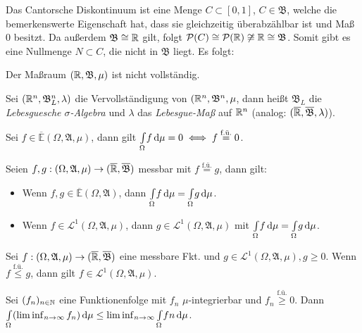 \documentclass{cheat-sheet}
\newcommand{\ER}{\overline\R} %
\newcommand{\PS}{\mathcal{P}} %
\newcommand{\Alg}{\mathfrak{A}} %
\newcommand{\Bor}{\mathfrak{B}} %
\newcommand{\E}{\mathbb{E}} %
\newcommand{\Leb}{\mathcal{L}} %
\newcommand{\fue}{\overset{\text{f.ü.}}} %
\newcommand{\IntOmu}[1]{\Int{\Omega}{}{#1}{\mu}} %
\begin{document}
\begin{bem}
  Das Cantorsche Diskontinuum ist eine Menge $C \subset [0, 1]$, $C \in \Bor$, welche die bemerkenswerte Eigenschaft hat, dass sie gleichzeitig überabzählbar ist und Maß $0$ besitzt. Da außerdem $\Bor \cong \R$ gilt, folgt $\PS(C) \cong \PS(\R) \not\cong \R \cong \Bor$. Somit gibt es eine Nullmenge $N \subset C$, die nicht in $\Bor$ liegt. Es folgt:
\end{bem}

\begin{satz}
  Der Maßraum $(\R, \Bor, \mu)$ ist nicht vollständig.
\end{satz}

\begin{defn}
  Sei $(\R^n, \Bor_L^n, \lambda)$ die Vervollständigung von $(\R^n, \Bor^n, \mu$, dann heißt $\Bor_L$ die \emph{Lebesguesche $\sigma$-Algebra} und $\lambda$ das \emph{Lebesgue-Maß} auf $\mathbb{R}^n$ (analog: $(\ER, \overline{\Bor}, \lambda)$).
\end{defn}

\begin{satz}
  Sei $f \in \overline{\E}(\Omega, \Alg, \mu)$, dann gilt $\IntOmu{f} = 0 \iff f \overset{\text{f.ü.}}= 0$.
\end{satz}

\vspace{-10pt}

\begin{satz}
  Seien $f, g : (\Omega, \Alg, \mu) \to (\ER, \overline{\Bor})$ messbar mit $f \fue= g$, dann gilt:
  \begin{itemize}
    \item Wenn $f, g \in \overline{\E}(\Omega, \Alg)$, dann $\IntOmu{f} = \IntOmu{g}$.
    \item Wenn $f \in \Leb^1(\Omega, \Alg, \mu)$, dann $g \in \Leb^1(\Omega, \Alg, \mu)$ mit $\IntOmu{f} = \IntOmu{g}$.
  \end{itemize}
\end{satz}

\begin{satz}
  Sei $f : (\Omega, \Alg, \mu) \to (\ER, \overline{\Bor})$ eine messbare Fkt. und $g \in \Leb^1(\Omega, \Alg, \mu), g \geq 0$. Wenn $f \fue\leq g$, dann gilt $f \in \Leb^1(\Omega, \Alg, \mu)$.
\end{satz}

\begin{satz}\begin{doublespace}
  Sei $(f_n)_{n \in \mathbb{N}}$ eine Funktionenfolge mit $f_n$ $\mu$-integrierbar und $f_n \overset{\text{f.ü.}}\geq 0$. Dann $\IntOmu{(\liminf_{n \to \infty} f_n)} \leq \liminf_{n \to \infty} \IntOmu{fn}$.
\end{doublespace}\end{satz}
\end{document}
